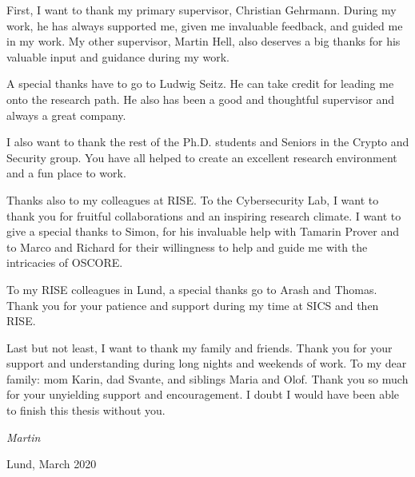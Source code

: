 First, I want to thank my primary supervisor, Christian Gehrmann. During my work, he has always supported me, given me invaluable feedback, and guided me in my work. My other supervisor, Martin Hell, also deserves a big thanks for his valuable input and guidance during my work.

A special thanks have to go to Ludwig Seitz. He can take credit for leading me onto the research path. He also has been a good and thoughtful supervisor and always a great company.

I also want to thank the rest of the Ph.D. students and Seniors in the Crypto and Security group.
You have all helped to create an excellent research environment and a fun place to work.

Thanks also to my colleagues at RISE. To the Cybersecurity Lab, I want to thank you for fruitful collaborations and an inspiring research climate. I want to give a special thanks to Simon, for his invaluable help with Tamarin Prover and to Marco and Richard for their willingness to help and guide me with the intricacies of OSCORE.

To my RISE colleagues in Lund, a special thanks go to Arash and Thomas. Thank you for your patience and support during my time at SICS and then RISE.

Last but not least, I want to thank my family and friends. Thank you for your support and understanding during long nights and weekends of work.
To my dear family: mom Karin, dad Svante, and siblings Maria and Olof. Thank you so much for your unyielding support and encouragement. I doubt I would have been able to finish this thesis without you.

\begin{flushright}
	\emph{Martin}
	
	Lund, March 2020
\end{flushright}